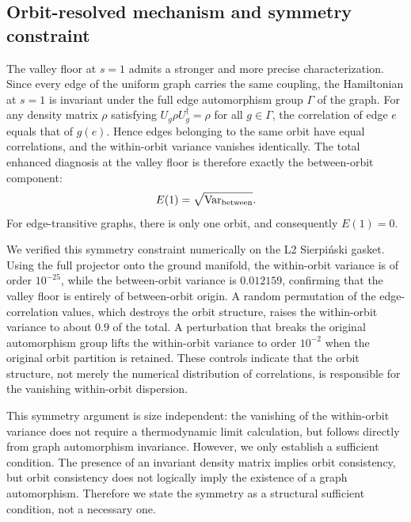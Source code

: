\documentclass[pdflatex,sn-mathphys-num,iicol]{sn-jnl}
\begin{document}
\subsection{Orbit-resolved mechanism and symmetry constraint}
\label{sec:orbit_mechanism}

The valley floor at $s=1$ admits a stronger and more precise characterization. Since every edge of the uniform graph carries the same coupling, the Hamiltonian at $s=1$ is invariant under the full edge automorphism group $\Gamma$ of the graph. For any density matrix $\rho$ satisfying $U_g\rho U_g^\dagger=\rho$ for all $g\in\Gamma$, the correlation of edge $e$ equals that of $g(e)$. Hence edges belonging to the same orbit have equal correlations, and the within-orbit variance vanishes identically. The total enhanced diagnosis at the valley floor is therefore exactly the between-orbit component:
\begin{equation}
E(1)=\sqrt{\mathrm{Var}_{\rm between}}.
\end{equation}
For edge-transitive graphs, there is only one orbit, and consequently $E(1)=0$.

We verified this symmetry constraint numerically on the L2 Sierpi\'{n}ski gasket. Using the full projector onto the ground manifold, the within-orbit variance is of order $10^{-25}$, while the between-orbit variance is $0.012159$, confirming that the valley floor is entirely of between-orbit origin. A random permutation of the edge-correlation values, which destroys the orbit structure, raises the within-orbit variance to about $0.9$ of the total. A perturbation that breaks the original automorphism group lifts the within-orbit variance to order $10^{-2}$ when the original orbit partition is retained. These controls indicate that the orbit structure, not merely the numerical distribution of correlations, is responsible for the vanishing within-orbit dispersion.

This symmetry argument is size independent: the vanishing of the within-orbit variance does not require a thermodynamic limit calculation, but follows directly from graph automorphism invariance. However, we only establish a sufficient condition. The presence of an invariant density matrix implies orbit consistency, but orbit consistency does not logically imply the existence of a graph automorphism. Therefore we state the symmetry as a structural sufficient condition, not a necessary one.
\end{document}
